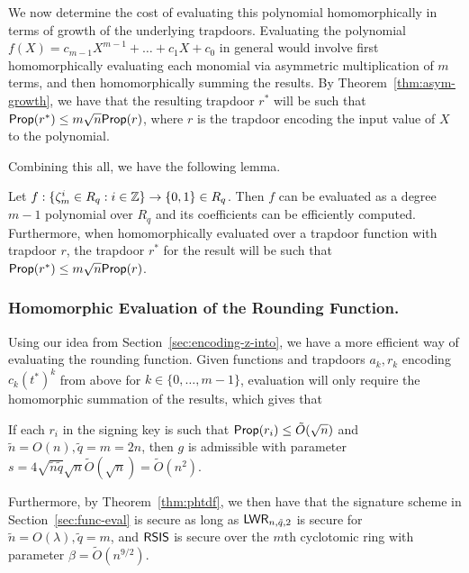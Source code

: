 We now determine the cost of evaluating this polynomial homomorphically in terms of
growth of the underlying trapdoors. Evaluating the polynomial 
$f(X) = c_{m-1}X^{m-1}+\ldots +c_{1}X+c_0$ in general would involve
first homomorphically evaluating each monomial via asymmetric
multiplication of $m$ terms, and then homomorphically summing the
results. By Theorem~\ref{thm:asym-growth}, we have that the resulting trapdoor
$r^*$ will be such that $\mathsf{Prop}(r^*) \leq m\sqrt{n}\mathsf{Prop}(r)$, where $r$ is the
trapdoor encoding the input value of $X$ to the polynomial. 

Combining this all, we have the following lemma.

\begin{lemma}\label{lem:lagrangefunc}Let $f: \{\zeta_m^{i} \in
  R_q: i \in \mathbb{Z}\} \to \{0,1\} \in R_q$. 
Then $f$ can be evaluated as a degree $m-1$ polynomial over $R_q$ and
its coefficients
can be efficiently computed. Furthermore, when
homomorphically evaluated over a trapdoor function with trapdoor
$r$, the trapdoor $r^*$ for the result will be such that $\mathsf{Prop}(r^*)
\leq m\sqrt{n}\mathsf{Prop}(r)$. 
\end{lemma}

 




\subsubsection{Homomorphic Evaluation of the Rounding Function.}
\label{sec:lwr-function}

Using our idea from Section~\ref{sec:encoding-z-into}, we have a more
efficient way of evaluating the rounding function. Given functions and
trapdoors $a_k, r_k$ encoding $c_k(t^*)^k$ from above for $k \in
\{0,\ldots,m-1\}$, evaluation will only require the homomorphic summation of the
results, which gives that

\begin{lemma}\label{lem:effevalcost}
If each $r_i$ in the signing key is such that $\mathsf{Prop}(r_i) \leq
\tilde{O}(\sqrt{n})$ and $\tilde{n}=O(n),\tilde{q}=m=2n$, then $g$ is admissible with parameter 
$s=4\sqrt{\tilde{n}\tilde{q}}\sqrt{n}\tilde{O}(\sqrt{n}) =
\tilde{O}(n^{2})$.

Furthermore, by  Theorem~\ref{thm:phtdf}, we then have that the signature
scheme in Section~\ref{sec:func-eval} is secure as long as
$\mathsf{LWR}_{n,\tilde{q},2}$ is secure for
$\tilde{n}=O(\lambda),\tilde{q}=m$, and  $\mathsf{RSIS}$ is secure over the
$m$th cyclotomic ring with parameter
  $\beta=\tilde{O}(n^{9/2})$.
\end{lemma}


